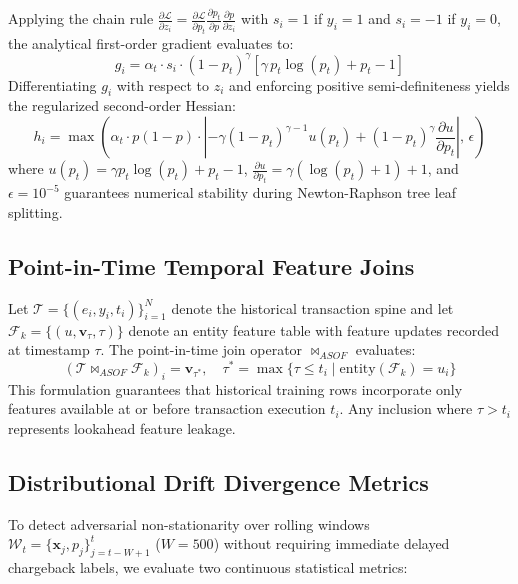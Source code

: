 Applying the chain rule $\frac{\partial \mathcal{L}}{\partial z_i} = \frac{\partial \mathcal{L}}{\partial p_t} \frac{\partial p_t}{\partial p} \frac{\partial p}{\partial z_i}$ with $s_i = 1$ if $y_i=1$ and $s_i = -1$ if $y_i=0$, the analytical first-order gradient evaluates to:
\begin{equation}
g_i = \alpha_t \cdot s_i \cdot (1 - p_t)^\gamma \left[ \gamma \, p_t \log(p_t) + p_t - 1 \right]
\end{equation}
Differentiating $g_i$ with respect to $z_i$ and enforcing positive semi-definiteness yields the regularized second-order Hessian:
\begin{equation}
h_i = \max\left( \alpha_t \cdot p(1 - p) \cdot \left| -\gamma (1 - p_t)^{\gamma - 1} u(p_t) + (1 - p_t)^\gamma \frac{\partial u}{\partial p_t} \right|, \, \epsilon \right)
\end{equation}
where $u(p_t) = \gamma p_t \log(p_t) + p_t - 1$, $\frac{\partial u}{\partial p_t} = \gamma (\log(p_t) + 1) + 1$, and $\epsilon = 10^{-5}$ guarantees numerical stability during Newton-Raphson tree leaf splitting.

\subsection{Point-in-Time Temporal Feature Joins}
Let $\mathcal{T} = \{(e_i, y_i, t_i)\}_{i=1}^N$ denote the historical transaction spine and let $\mathcal{F}_k = \{(u, \mathbf{v}_\tau, \tau)\}$ denote an entity feature table with feature updates recorded at timestamp $\tau$. The point-in-time join operator $\bowtie_{ASOF}$ evaluates:
\begin{equation}
(\mathcal{T} \bowtie_{ASOF} \mathcal{F}_k)_i = \mathbf{v}_{\tau^*}, \quad \tau^* = \max \{ \tau \le t_i \mid \text{entity}(\mathcal{F}_k) = u_i \}
\end{equation}
This formulation guarantees that historical training rows incorporate only features available at or before transaction execution $t_i$. Any inclusion where $\tau > t_i$ represents lookahead feature leakage.

\subsection{Distributional Drift Divergence Metrics}
To detect adversarial non-stationarity over rolling windows $\mathcal{W}_t = \{\mathbf{x}_j, p_j\}_{j=t-W+1}^t$ ($W=500$) without requiring immediate delayed chargeback labels, we evaluate two continuous statistical metrics:

